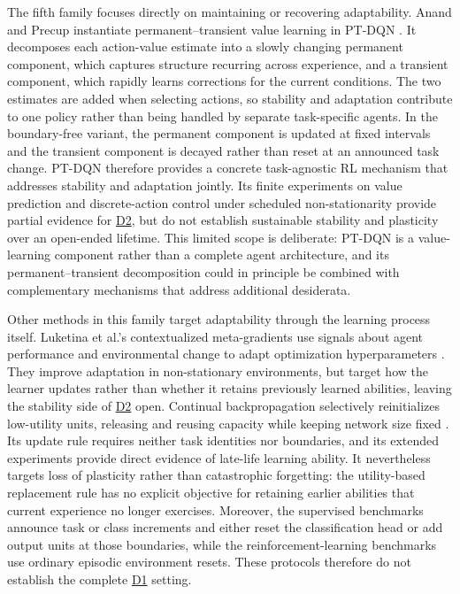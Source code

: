 \documentclass[10pt,journal,compsoc]{IEEEtran}
\DeclareRobustCommand{\Dref}[1]{\hyperref[sec:d#1]{D#1}}
\begin{document}
The fifth family focuses directly on maintaining or recovering adaptability.
Anand and Precup instantiate permanent--transient value learning in PT-DQN \cite{anand2023}.
It decomposes each action-value estimate into a slowly changing permanent component, which captures structure recurring across experience, and a transient component, which rapidly learns corrections for the current conditions.
The two estimates are added when selecting actions, so stability and adaptation contribute to one policy rather than being handled by separate task-specific agents.
In the boundary-free variant, the permanent component is updated at fixed intervals and the transient component is decayed rather than reset at an announced task change.
PT-DQN therefore provides a concrete task-agnostic RL mechanism that addresses stability and adaptation jointly.
Its finite experiments on value prediction and discrete-action control under scheduled non-stationarity provide partial evidence for \Dref{2}, but do not establish sustainable stability and plasticity over an open-ended lifetime.
This limited scope is deliberate: PT-DQN is a value-learning component rather than a complete agent architecture, and its permanent--transient decomposition could in principle be combined with complementary mechanisms that address additional desiderata.

Other methods in this family target adaptability through the learning process itself.
Luketina et al.'s contextualized meta-gradients use signals about agent performance and environmental change to adapt optimization hyperparameters \cite{luketina2022}.
They improve adaptation in non-stationary environments, but target how the learner updates rather than whether it retains previously learned abilities, leaving the stability side of \Dref{2} open.
Continual backpropagation selectively reinitializes low-utility units, releasing and reusing capacity while keeping network size fixed \cite{dohare2024}.
Its update rule requires neither task identities nor boundaries, and its extended experiments provide direct evidence of late-life learning ability.
It nevertheless targets loss of plasticity rather than catastrophic forgetting: the utility-based replacement rule has no explicit objective for retaining earlier abilities that current experience no longer exercises.
Moreover, the supervised benchmarks announce task or class increments and either reset the classification head or add output units at those boundaries, while the reinforcement-learning benchmarks use ordinary episodic environment resets.
These protocols therefore do not establish the complete \Dref{1} setting.
\end{document}

